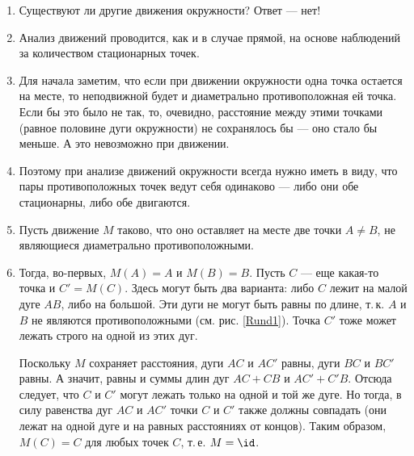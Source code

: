 \begin{enumerate}


\item Существуют ли другие движения окружности? Ответ --- нет!
\item Анализ движений проводится, как и в случае прямой, на основе наблюдений за количеством стационарных точек.
\item Для начала заметим, что если при движении окружности одна точка остается на месте, то неподвижной будет и диаметрально противоположная ей точка. Если бы это было не так, то, очевидно, расстояние между этими точками (равное половине дуги окружности) не сохранялось бы --- оно стало бы меньше. А это невозможно при движении.
\item Поэтому при анализе движений окружности всегда нужно иметь в виду, что пары противоположных точек ведут себя одинаково --- либо они обе стационарны, либо обе двигаются.
\item Пусть движение $M$ таково, что оно оставляет на месте две точки $A\ne B$, не являющиеся диаметрально противоположными.
\item Тогда, во-первых, $M(A)=A$ и $M(B)=B$. Пусть $C$ --- еще какая-то точка и $C'=M(C)$. Здесь могут быть два варианта: либо $C$ лежит на малой дуге $AB$, либо на большой. Эти дуги не могут быть равны по длине, т.\,к. $A$ и $B$ не являются противоположными (см. рис. \ref{Rund1}). Точка $C'$ тоже может лежать строго на одной из этих дуг.

Поскольку $M$ сохраняет расстояния, дуги $AC$ и $AC'$ равны, дуги $BC$ и $BC'$ равны. А значит, равны и суммы длин дуг $AC+CB$ и $AC'+C'B$. Отсюда следует, что $C$ и $C'$ могут лежать только на одной и той же дуге. Но тогда, в силу равенства дуг $AC$ и $AC'$ точки $C$ и $C'$ также должны совпадать (они лежат на одной дуге и на равных расстояниях от концов). Таким образом, $M(C)=C$ для любых точек $C$, т.\,е. $M=\id$.


\end{enumerate}
